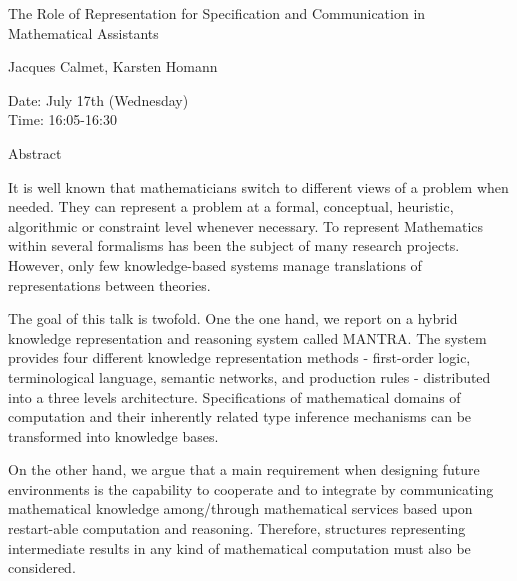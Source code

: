 \begin{center}
\LARGE
The Role of Representation for Specification and
          Communication in Mathematical Assistants

\end{center}

\begin{center}
\Large
Jacques Calmet, Karsten Homann

\end{center}

\noindent
Date:  July 17th (Wednesday)\\
Time:  16:05-16:30\\

\begin{center}
\large
Abstract
\end{center}

It is well known that mathematicians switch to different views of a problem when needed. They
can represent a problem at a formal, conceptual, heuristic, algorithmic or constraint level
whenever necessary. To represent Mathematics within several formalisms has been the subject of
many research projects. However, only few knowledge-based systems manage translations of
representations between theories. 

The goal of this talk is twofold. One the one hand, we report on a hybrid knowledge representation
and reasoning system called MANTRA. The system provides four different knowledge
representation methods - first-order logic, terminological language, semantic networks, and
production rules - distributed into a three levels architecture. Specifications of mathematical
domains of computation and their inherently related type inference mechanisms can be
transformed into knowledge bases. 

On the other hand, we argue that a main requirement when designing future environments is the
capability to cooperate and to integrate by communicating mathematical knowledge
among/through mathematical services based upon restart-able computation and reasoning.
Therefore, structures representing intermediate results in any kind of mathematical computation
must also be considered. 


